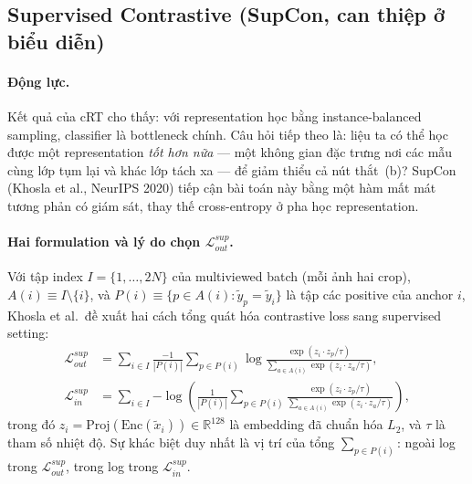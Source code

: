 
\subsection{Supervised Contrastive (SupCon, can thiệp ở biểu diễn)}

\paragraph{Động lực.}
Kết quả của cRT cho thấy: với representation học bằng instance-balanced sampling,
classifier là bottleneck chính.
Câu hỏi tiếp theo là: liệu ta có thể học được một representation \emph{tốt hơn nữa}
--- một không gian đặc trưng nơi các mẫu cùng lớp tụm lại và khác lớp tách xa ---
để giảm thiểu cả nút thắt~(b)?
SupCon \cite{khosla2020supcon} (Khosla et al., NeurIPS 2020) tiếp cận
bài toán này bằng một hàm mất mát tương phản có giám sát,
thay thế cross-entropy ở pha học representation.

\paragraph{Hai formulation và lý do chọn $\mathcal{L}^{sup}_{out}$.}
Với tập index $I = \{1,\ldots,2N\}$ của multiviewed batch (mỗi ảnh hai crop),
$A(i) \equiv I \setminus \{i\}$, và $P(i) \equiv \{p \in A(i) : \tilde{y}_p = \tilde{y}_i\}$
là tập các positive của anchor $i$, Khosla et al.\ đề xuất hai cách tổng quát hóa
contrastive loss sang supervised setting:
\begin{align}
    \mathcal{L}^{sup}_{out}
    &= \sum_{i \in I} \frac{-1}{|P(i)|}
       \sum_{p \in P(i)}
       \log \frac{\exp(z_i \cdot z_p / \tau)}
                 {\sum_{a \in A(i)} \exp(z_i \cdot z_a / \tau)},
    \label{eq:supcon-out} \\[4pt]
    \mathcal{L}^{sup}_{in}
    &= \sum_{i \in I}
       {-\log} \!\left(
         \frac{1}{|P(i)|}
         \sum_{p \in P(i)}
         \frac{\exp(z_i \cdot z_p / \tau)}
              {\sum_{a \in A(i)} \exp(z_i \cdot z_a / \tau)}
       \right),
    \label{eq:supcon-in}
\end{align}
trong đó $z_i = \mathrm{Proj}(\mathrm{Enc}(\tilde{x}_i)) \in \mathbb{R}^{128}$
là embedding đã chuẩn hóa $L_2$, và $\tau$ là tham số nhiệt độ.
Sự khác biệt duy nhất là vị trí của tổng $\sum_{p \in P(i)}$:
ngoài log trong $\mathcal{L}^{sup}_{out}$, trong log trong $\mathcal{L}^{sup}_{in}$.

